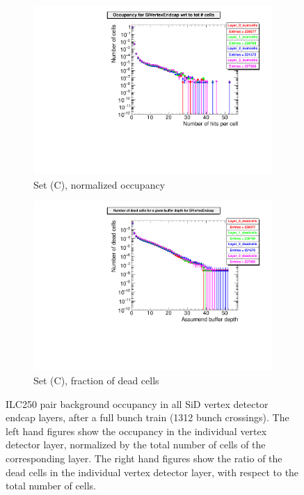 \begin{figure}[htb]
\begin{subfigure}[b]{0.49\textwidth}
   \centering
    \includegraphics[width=\textwidth]{Figures/Pairs/Appendix/occupancy_numcells_SiVertexEndcap_ILC250_SetC.pdf}
   \caption{Set (C), normalized occupancy}
   \end{subfigure}
   \hfill
    \begin{subfigure}[b]{0.49\textwidth}
   \centering
    \includegraphics[width=\textwidth]{Figures/Pairs/Appendix/occupancy_deadcells_SiVertexEndcap_ILC250_SetC.pdf}
   \caption{Set (C), fraction of dead cells}
   \end{subfigure}
   \caption[Pair background occupancy in all SiD vertex detector endcap layers for the ILC250]{ILC250 pair background occupancy in all SiD vertex detector endcap layers, after a full bunch train (1312 bunch crossings).
   The left hand figures show the occupancy in the individual vertex detector layer, normalized by the total number of cells of the corresponding layer.
   The right hand figures show the ratio of the dead cells in the individual vertex detector layer, with respect to the total number of cells.
   }
   \label{fig:PairBkg:ILC250_Occupancy_Layers_VXDEndcap}
 \end{figure}
 

